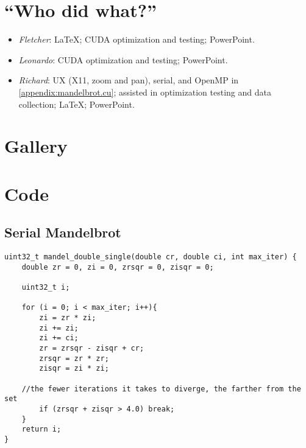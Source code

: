 \documentclass{article}
\begin{document}
\pagebreak    
\appendix
    \section{``Who did what?''}
        \begin{itemize}
        	\item \emph{Fletcher}: \LaTeX{}; CUDA optimization and testing; PowerPoint.

        	\item \emph{Leonardo}: CUDA optimization and testing; PowerPoint.

        	\item \emph{Richard}: UX (X11, zoom and pan), serial, and OpenMP in \ref{appendix:mandelbrot.cu}; assisted in optimization testing and data collection; \LaTeX{}; PowerPoint.
        \end{itemize}

    \section{Gallery}
        

    \section{Code}
        \lstset{language=C,stringstyle=\ttfamily, showstringspaces=false, numbers=left, frame=single, framexrightmargin=0pt, columns=fullflexible, breaklines=true, breakatwhitespace=true}

        \subsection{Serial Mandelbrot}\label{appendix:serial}
\begin{lstlisting}
uint32_t mandel_double_single(double cr, double ci, int max_iter) {
    double zr = 0, zi = 0, zrsqr = 0, zisqr = 0;

    uint32_t i;

    for (i = 0; i < max_iter; i++){
		zi = zr * zi;
		zi += zi;
		zi += ci;
		zr = zrsqr - zisqr + cr;
		zrsqr = zr * zr;
		zisqr = zi * zi;
		
    //the fewer iterations it takes to diverge, the farther from the set
		if (zrsqr + zisqr > 4.0) break;
    }
    return i;
}
\end{lstlisting}
\end{document}
